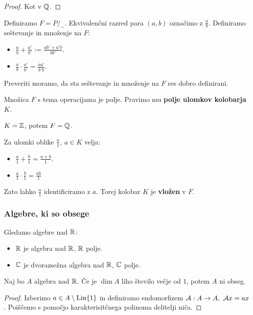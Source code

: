 \begin{proof}
    Kot v $\mathbb{Q}$.
\end{proof}

Definiramo $F = P/_\sim$. Ekvivalenčni razred para $(a,b)$ označimo z $\frac{a}{b}$. Definiramo seštevanje in množenje na $F$:
\begin{itemize}
    \item $\frac{a}{b} + \frac{a'}{b'} := \frac{ab' + a'b}{bb'}$.
    \item $\frac{a}{b} \cdot \frac{a'}{b'} = \frac{aa'}{b'b}$.
\end{itemize}
Preveriti moramo, da sta seštevanje in množenje na $F$ res dobro definirani.
\begin{trditev}
    Množica $F$ s tema operacijama je polje. Pravimo mu \textbf{polje ulomkov kolobarja $K$}.
\end{trditev}

\begin{primer}
    $K = \mathbb{Z}$, potem $F = \mathbb{Q}$.
\end{primer}

\begin{opomba}
    Za ulomki oblike $\frac{a}{1}, \ a \in K$ velja:
    \begin{itemize}
        \item $\frac{a}{1} + \frac{b}{1} = \frac{a+b}{1}$.
        \item $\frac{a}{1} \cdot \frac{b}{1} = \frac{ab}{1}$
    \end{itemize}
    Zato lahko $\frac{a}{1}$ identificiramo z $a$. Torej kolobar $K$ je \textbf{vložen} v $F$.
\end{opomba}

\subsubsection*{Algebre, ki so obsege}
Gledamo algebre nad $\mathbb{R}$:
\begin{itemize}
    \item $\mathbb{R}$ je algebra nad $\mathbb{R}$, $\mathbb{R}$ polje.
    \item $\mathbb{C}$ je dvorazsežna algebra nad $\mathbb{R}$, $\mathbb{C}$ polje.
\end{itemize}

\begin{trditev}
    Naj bo $A$ algebra nad $\mathbb{R}$. Če je $\dim A$ liho število večje od $1$, potem $A$ ni obseg.
\end{trditev}

\begin{proof}
    Izberimo $a \in A \setminus \operatorname{Lin} \{1\}$ in definiramo endomorfizem $\mathcal{A}: A \to A, \ \mathcal{A}x = ax$. Poiščemo s pomočjo karakterisitčnega polinoma delitelji niča.
\end{proof}


